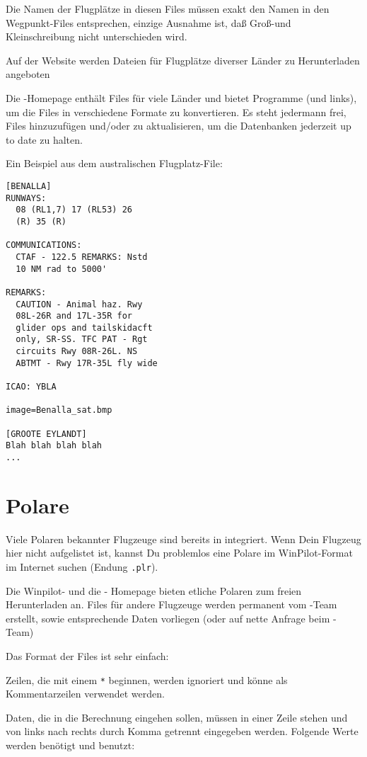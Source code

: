 Die Namen der Flugplätze in diesen Files müssen exakt den Namen in den Wegpunkt-Files entsprechen,
einzige Ausnahme ist, daß Groß-und Kleinschreibung nicht unterschieden wird.

Auf der \xc Website werden Dateien für Flugplätze diverser Länder zu Herunterladen angeboten


Die \xc-Homepage enthält Files für viele Länder und bietet Programme (und links), um die
Files in verschiedene Formate zu konvertieren.  Es steht jedermann frei, Files hinzuzufügen und/oder zu aktualisieren,
um die Datenbanken jederzeit up to date zu halten.

Ein Beispiel aus dem australischen Flugplatz-File:
\begin{verbatim}
[BENALLA]
RUNWAYS:
  08 (RL1,7) 17 (RL53) 26
  (R) 35 (R)

COMMUNICATIONS:
  CTAF - 122.5 REMARKS: Nstd
  10 NM rad to 5000'

REMARKS:
  CAUTION - Animal haz. Rwy
  08L-26R and 17L-35R for
  glider ops and tailskidacft
  only, SR-SS. TFC PAT - Rgt
  circuits Rwy 08R-26L. NS
  ABTMT - Rwy 17R-35L fly wide

ICAO: YBLA

image=Benalla_sat.bmp

[GROOTE EYLANDT]
Blah blah blah blah
...
\end{verbatim}

\section{Polare}\label{sec:glide-polar}

Viele Polaren bekannter Flugzeuge sind bereits in \xc integriert.  Wenn Dein Flugzeug  hier nicht
aufgelistet ist, kannst Du problemlos eine Polare im {\sc WinPilot}-Format im Internet suchen (Endung
\verb|.plr|).

Die Winpilot- und die \xc - Homepage bieten etliche Polaren zum freien Herunterladen an. Files für
andere Flugzeuge werden permanent vom \xc-Team erstellt, sowie entsprechende Daten vorliegen (oder
auf nette Anfrage beim \xc-Team)

Das Format der Files ist sehr einfach:

Zeilen, die mit einem \verb|*| beginnen, werden ignoriert und könne als Kommentarzeilen verwendet
werden.

Daten, die in die Berechnung eingehen sollen, müssen in einer Zeile stehen und von links nach rechts durch
Komma getrennt eingegeben werden. Folgende Werte werden benötigt und benutzt:

